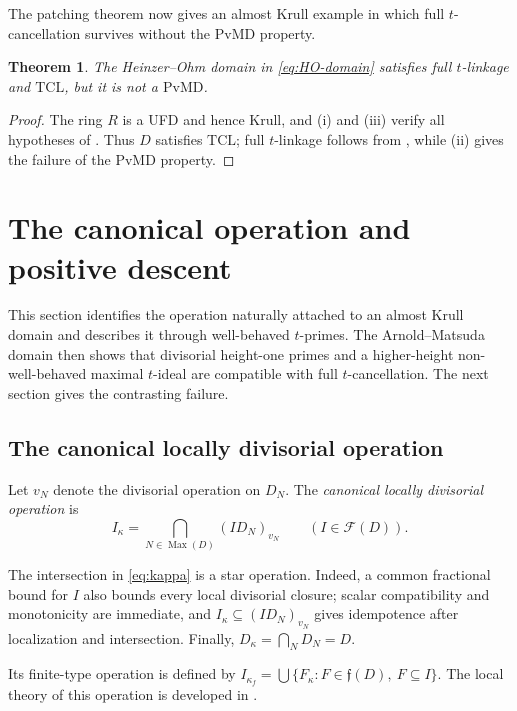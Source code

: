\documentclass[11pt]{amsart}
\newtheorem{theorem}{Theorem}[section]
\theoremstyle{definition}
\theoremstyle{remark}
\newcommand{\Fcal}{\mathcal F}
\newcommand{\fcal}{\mathfrak f}
\newcommand{\PvMD}{\mathrm{PvMD}}
\newcommand{\TCL}{\mathrm{TCL}}
\newcommand{\Max}{\operatorname{Max}}
\begin{document}
The patching theorem now gives an almost Krull example in which full
$t$-cancellation survives without the $\PvMD$ property.

\begin{theorem}\label{thm:HO-TCL}
The Heinzer--Ohm domain in \eqref{eq:HO-domain} satisfies full $t$-linkage and
$\TCL$, but it is not a $\PvMD$.
\end{theorem}

\begin{proof}
The ring $R$ is a UFD and hence Krull, and
(i) and (iii) verify all hypotheses of
.  Thus $D$ satisfies $\TCL$; full $t$-linkage follows
from , while
(ii) gives the failure of the $\PvMD$ property.
\end{proof}

\section{The canonical operation and positive descent}\label{sec:descent}

This section identifies the operation naturally attached to an almost Krull
domain and describes it through well-behaved $t$-primes.  The
Arnold--Matsuda domain then shows that divisorial height-one primes and a
higher-height non-well-behaved maximal $t$-ideal are compatible with full
$t$-cancellation.  The next section gives the contrasting failure.

\subsection{The canonical locally divisorial operation}
 Let $v_N$ denote the divisorial
operation on $D_N$.  The \emph{canonical locally divisorial operation} is
\begin{equation}\label{eq:kappa}
 I_\kappa=\bigcap_{N\in\Max(D)}(ID_N)_{v_N}
 \qquad (I\in\Fcal(D)).
\end{equation}

The intersection in \eqref{eq:kappa} is a star operation.  Indeed, a
common fractional bound for $I$ also bounds every local divisorial closure;
scalar compatibility and monotonicity are immediate, and
$I_\kappa\subseteq(ID_N)_{v_N}$ gives idempotence after localization and
intersection.  Finally, $D_\kappa=\bigcap_ND_N=D$.

Its finite-type operation is defined by
$I_{\kappa_f}=\bigcup\{F_\kappa:F\in\fcal(D),\ F\subseteq I\}$.
The local theory of this operation is developed in
\cite{ElBaghdadiIzelgueTamoussit}.
\end{document}
